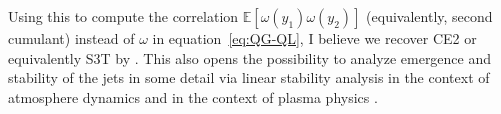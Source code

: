 \documentclass[11pt,reqno,a4paper]{amsart}
\newcommand{\EE}{\mathbb{E}}
\theoremstyle{definition}
\begin{document}
Using this to compute the correlation
$\EE\left[\omega(y_1)\omega(y_2)\right]$ (equivalently, second
cumulant) instead of $\omega$ in equation~\eqref{eq:QG-QL}, I believe
we recover CE2 \cite{marston-conover-schneider:2008} or equivalently
S3T by \cite{farrell-ioannou:2003, farrell-ioannou:2007}. This also
opens the possibility to analyze emergence and stability of the jets
in some detail via linear stability analysis in the context of
atmosphere dynamics \cite{bakas-ioannou:2011, bakas-ioannou:2013} and
in the context of plasma physics \cite{parker-krommes:2013,
  parker-krommes:2014}.

\begin{multicols}{2}
  \footnotesize
  \setlength{\bibsep}{0.0pt}
  
  
  
\end{multicols}
\end{document}
